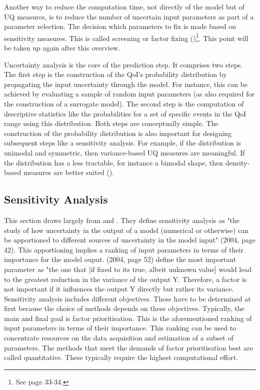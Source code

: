 \documentclass[a4paper,12pt]{article}
\begin{document}
Another way to reduce the computation time, not directly of the model but of UQ measures, is to reduce the number of uncertain input parameters as part of a parameter selection. The decision which parameters to fix is made based on sensitivity measures. This is called screening or factor fixing (\cite{Saltelli.2008})\footnote{See page 33-34.}. This point will be taken up again after this overview.

Uncertainty analysis is the core of the prediction step. It comprises two steps. The first step is the  construction of the QoI's probability distribution by propagating the input uncertainty through the model. For instance, this can be achieved by evaluating a sample of random input parameters (as also required for the construction of a surrogate model). The second step is the computation of descriptive statistics like the probabilities for a set of specific events in the QoI range using this distribution. Both steps are conceptually simple. The construction of the probability distribution is also important for designing subsequent steps like a sensitivity analysis. For example, if the distribution is unimodal and symmetric, then variance-based UQ measures are meaningful. If the distribution has a less tractable, for instance a bimodal shape, then density-based measures are better suited (\cite{plischke2013global}).


\subsection{Sensitivity Analysis}


This section draws largely from \cite{Saltelli.2004} and \cite{Saltelli.2008}.
They define sensitivity analysis as "the study of how uncertainty in the output of a model (numerical or otherwise) can be apportioned to different sources of uncertainty in the model input" \citeauthor{Saltelli.2004} (2004, page 42). This apportioning implies a ranking of input parameters in terms of their importance for the model ouput. \citeauthor{Saltelli.2004} (2004, page 52) define the most important parameter as "the one that [if fixed to its true, albeit unknown value]
would lead to the greatest reduction in the variance of the output Y. Therefore, a factor is not important if it influences the output Y directly but rather its variance.\\

\noindent
Sensitivity analysis includes different objectives. These have to be determined at first because the choice of methods depends on these objectives. Typically, the main and final goal is factor prioritisation. This is the aforementioned ranking of input parameters in terms of their importance. This ranking can be used to concentrate resources on the data acquisition and estimation of a subset of parameters. The methods that meet the demands of factor prioritisation best are called quantitative. These typically require the highest computational effort.
\end{document}
